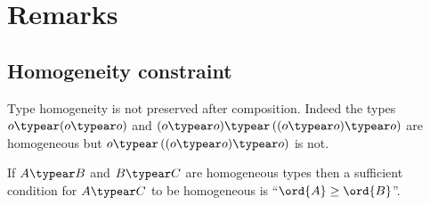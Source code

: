 \section{Remarks}
\subsection{Homogeneity constraint}

Type homogeneity is not preserved after composition. Indeed the
types  $o \typear (o \typear o)$ and $(o \typear o) \typear \left((o
\typear o) \typear o \right)$ are homogeneous but $o \typear
\left((o \typear o) \typear o\right)$ is not.

If $A\typear B$ and $B \typear C$ are homogeneous types then  a
sufficient condition for $A\typear C$ to be homogeneous is
``$\ord{A} \geq \ord{B}$''.

